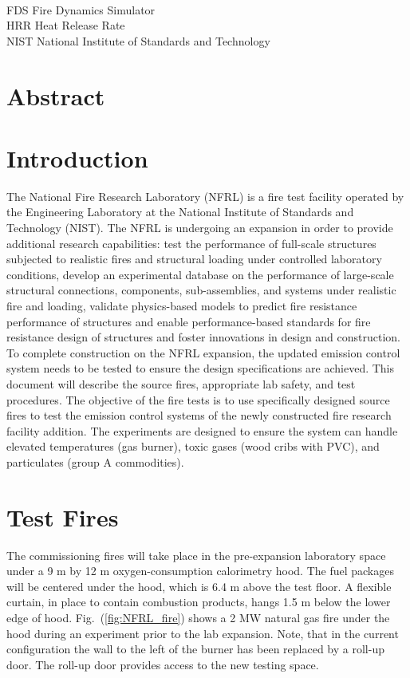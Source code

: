 \documentclass[12pt,oneside]{book}
\begin{document}
\begin{tabbing}
\hspace{1.5in} \= \\
FDS \> Fire Dynamics Simulator \\
HRR \> Heat Release Rate \\
NIST \> National Institute of Standards and Technology \\
\end{tabbing}

\mainmatter

\chapter*{\centering Abstract}

\chapter{Introduction}
\setcounter{page}{1}
The National Fire Research Laboratory (NFRL) is a fire test facility operated by the Engineering Laboratory at the National Institute of Standards and Technology (NIST). The NFRL is undergoing an expansion in order to provide additional research capabilities: test the performance of full-scale structures subjected to realistic fires and structural loading under controlled laboratory conditions, develop an experimental database on the performance of large-scale structural connections, components, sub-assemblies, and systems under realistic fire and loading, validate physics-based models to predict fire resistance performance of structures and enable performance-based standards for fire resistance design of structures and foster innovations in design and construction. To complete construction on the NFRL expansion, the updated emission control system needs to be tested to ensure the design specifications are achieved. This document will describe the source fires, appropriate lab safety, and test procedures. The objective of the fire tests is to use specifically designed source fires to test the emission control systems of the newly constructed fire research facility addition. The experiments are designed to ensure the system can handle elevated temperatures (gas burner), toxic gases (wood cribs with PVC), and particulates (group A commodities).

\chapter{Test Fires}
\label{test_fire}
The commissioning fires will take place in the pre-expansion laboratory space under a 9 m by 12 m oxygen-consumption calorimetry hood. The fuel packages will be centered under the hood, which is 6.4 m above the test floor. A flexible curtain, in place to contain combustion products, hangs 1.5 m below the lower edge of hood. Fig.~(\ref{fig:NFRL_fire}) shows a 2 MW natural gas fire under the hood during an experiment prior to the lab expansion. Note, that in the current configuration the wall to the left of the burner has been replaced by a roll-up door. The roll-up door provides access to the new testing space.
\end{document}
